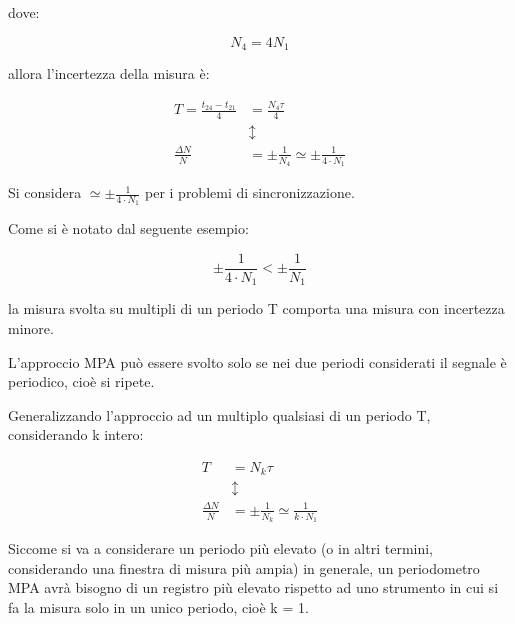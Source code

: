 \newpage 

dove: 

{
    \Large 
    \begin{equation}
        N_4 = 4 N_1
    \end{equation}
}

allora l'incertezza della misura è: 

{
    \Large 
    \begin{equation}
        \begin{split}
            T = \frac{t_{24} - t_{21} }{4} &= \frac{N_4 \tau}{4}
            \\
            &\updownarrow
            \\
            \frac{\Delta N}{N} &= \pm \frac{1}{N_4} \simeq \pm \frac{1}{4 \cdot N_1}
        \end{split}
    \end{equation}
}

Si considera $\simeq \pm \frac{1}{4 \cdot N_1}$ per i problemi di sincronizzazione. \newline 

Come si è notato dal seguente esempio: 

{
    \Large
    \begin{equation}
        \pm \frac{1}{4 \cdot N_1} < \pm \frac{1}{N_1}
    \end{equation}
}

la misura svolta su multipli di un periodo T comporta una misura con incertezza minore. \newline 

L'approccio MPA può essere svolto solo se nei due periodi considerati il segnale è periodico, cioè si ripete. \newline 

Generalizzando l'approccio ad un multiplo qualsiasi di un periodo T, considerando k intero: 

{
    \Large 
    \begin{equation}
        \begin{split}
            T &= N_k \tau
            \\ 
            &\updownarrow
            \\
            \frac{\Delta N}{N}
            &= 
            \pm 
            \frac{1}{N_k}
            \simeq 
            \frac{1}{k \cdot N_1}
        \end{split}
    \end{equation}
}

Siccome si va a considerare un periodo più elevato (o in altri termini, considerando una finestra di misura più ampia) 
in generale, un periodometro MPA avrà bisogno di un registro più elevato rispetto ad uno strumento in cui si fa la misura solo in un unico periodo, cioè k = 1. \newline 

